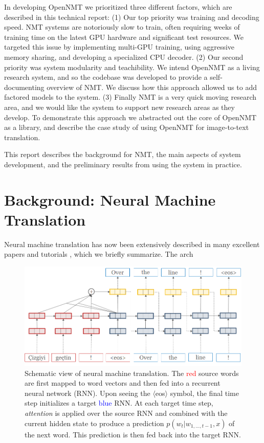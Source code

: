 \documentclass[11pt]{article}
\begin{document}
In developing OpenNMT we prioritized three different factors, which
are described in this technical report: (1) Our top priority was
training and decoding speed. NMT systems are notoriously slow to
train, often requiring weeks of training time on the latest GPU
hardware and significant test resources. We targeted this issue by
implementing multi-GPU training, using aggressive memory sharing, and
developing a specialized CPU decoder. (2) Our second priority was system
modularity and teachibility. We intend OpenNMT as a living research
system, and so the codebase was developed to provide a
self-documenting overview of NMT. We discuss how this approach allowed
us to add factored models \cite{} to the system. (3) Finally NMT is a very 
quick moving research area, and we would like the system to support 
new research areas as they develop. To demonstrate this approach we 
abstracted out the core of OpenNMT as a library, and describe the case 
study of using OpenNMT for image-to-text translation. 

This report describes the background for NMT, the main aspects of system development, and the preliminary results from using the system in practice.  


\section{Background: Neural Machine Translation}

Neural machine translation has now been extensively described in many
excellent papers and tutorials \cite{}, which we briefly summarize. 
The arch


\begin{figure}
  \centering
  \includegraphics[width=\linewidth]{simple-attn}
  \caption{Schematic view of neural machine translation. The \textcolor{red}{red} source words are first mapped to word vectors and then fed into a recurrent neural network (RNN). Upon seeing the $\langle$eos$\rangle$ symbol, the final time step initializes a target \textcolor{blue}{blue} RNN. At each target time step, \textit{attention} is applied over the source RNN and combined with the current hidden state to produce a prediction $p(w_t| w_{1, \ldots, t-1}, x)$ of the next word. This prediction is then fed back into the target RNN.}
\end{figure}
\end{document}

